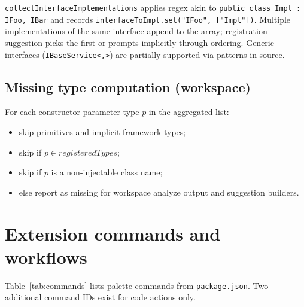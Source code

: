 \texttt{collectInterfaceImplementations} applies regex akin to \texttt{public class Impl : IFoo, IBar} and records \texttt{interfaceToImpl.set("IFoo", ["Impl"])}. Multiple implementations of the same interface append to the array; registration suggestion picks the first or prompts implicitly through ordering. Generic interfaces (\texttt{IBaseService<,>}) are partially supported via patterns in source.

\subsection{Missing type computation (workspace)}

For each constructor parameter type \(p\) in the aggregated list:
\begin{itemize}
	\item skip primitives and implicit framework types;
	\item skip if \(p \in registeredTypes\);
	\item skip if \(p\) is a non-injectable class name;
	\item else report as missing for workspace analyze output and suggestion builders.
\end{itemize}

\section{Extension commands and workflows}
\label{chap4:commands}

Table~\ref{tab:commands} lists palette commands from \texttt{package.json}. Two additional command IDs exist for code actions only.

